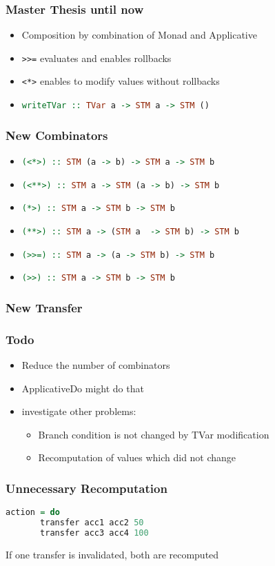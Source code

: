 \documentclass{beamer}
\begin{document}
  \begin{frame}
   \frametitle{Master Thesis until now}
   \begin{itemize}\setlength\itemsep{1em}
    \item Composition by combination of Monad and Applicative
    \item\lstinline{>>=} evaluates and enables rollbacks
    \item\lstinline{<*>} enables to modify values without rollbacks
    \item \lstinline[language=Haskell]{writeTVar :: TVar a -> STM a -> STM ()} 
   \end{itemize}
  \end{frame}
  
  \begin{frame}
   \frametitle{New Combinators}
   \begin{itemize}\setlength\itemsep{1em}
    \item \lstinline[language=Haskell]{(<*>) :: STM (a -> b) -> STM a -> STM b}
    \item \lstinline[language=Haskell]{(<**>) :: STM a -> STM (a -> b) -> STM b}
    \item \lstinline[language=Haskell]{(*>) :: STM a -> STM b -> STM b}
    \item \lstinline[language=Haskell]{(**>) :: STM a -> (STM a  -> STM b) -> STM b}
    \item \lstinline[language=Haskell]{(>>=) :: STM a -> (a -> STM b) -> STM b}
    \item \lstinline[language=Haskell]{(>>) :: STM a -> STM b -> STM b}
   \end{itemize}
  \end{frame}

  
  \begin{frame}[plain]
    \frametitle{New Transfer}
    
  \end{frame}
  
  
  
  
  \begin{frame}
   \frametitle{Todo}
   \begin{itemize}\setlength\itemsep{1em}
    \item Reduce the number of combinators
    \item ApplicativeDo might do that
    \item investigate other problems:
      \begin{itemize}
        \item Branch condition is not changed by TVar modification
        \item Recomputation of values which did not change
      \end{itemize}
   \end{itemize}
  \end{frame}

  \begin{frame}[fragile]
    \frametitle{Unnecessary Recomputation}
    \begin{lstlisting}[language=Haskell]
     action = do
       transfer acc1 acc2 50
       transfer acc3 acc4 100
    \end{lstlisting}
    \vfill
    If one transfer is invalidated, both are recomputed
\end{frame}


  
\end{document}
